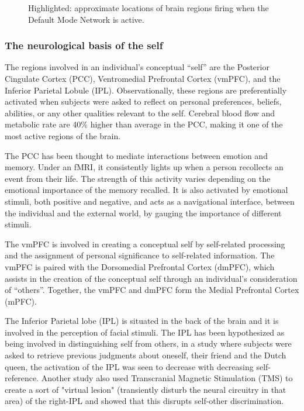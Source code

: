 \documentclass[a4paper, amsfonts, amssymb, amsmath, reprint, showkeys, nofootinbib, twoside]{revtex4-1}
\begin{document}
\begin{figure}[h!]
\begin{subfigure}[b]{0.48\linewidth}
  \end{subfigure}
  \caption{Highlighted: approximate locations of brain regions firing when the Default Mode Network is active.}
  \label{fig:dmn}
\end{figure}

\subsubsection{The neurological basis of the self}

The regions involved in an individual's conceptual ``self'' are the Posterior
Cingulate Cortex (PCC), Ventromedial Prefrontal Cortex (vmPFC), and the Inferior
Parietal Lobule (IPL). Observationally, these regions are preferentially activated when
subjects were asked to reflect on personal preferences, beliefs, abilities, or
any other qualities relevant to the self. \cite{defaultnetworkadaptive} Cerebral
blood flow and metabolic rate are 40\% higher than average in the PCC,
making it one of the most active regions of the brain. \cite{pccrole}

The PCC has been thought to mediate interactions between emotion and memory.
Under an fMRI, it consistently lights up when a person recollects an event from their
life. The strength of this activity varies depending on the emotional importance of
the memory recalled. It is also activated by emotional stimuli,
both positive and negative, and acts as a navigational interface, between the individual
and the external world, by gauging the importance of different stimuli. \cite{pccemotion}

The vmPFC is involved in creating a conceptual self by self-related processing
and the assignment of personal significance to self-related
information. \cite{dmnself} The vmPFC is paired with the Dorsomedial Prefrontal
Cortex (dmPFC), which assists in the creation of the conceptual self through an
individual's consideration of ``others''. Together, the vmPFC and dmPFC form the
Medial Prefrontal Cortex (mPFC).

The Inferior Parietal lobe (IPL) is situated in the back of the brain and it is
involved in the perception of facial stimuli. \cite{ipl}
The IPL has been hypothesized as being involved in distinguishing self from others, 
in a study where subjects were asked to retrieve 
previous judgments about oneself, their friend and the Dutch queen, 
the activation of the IPL was seen to decrease with decreasing self-reference. \cite{iplself} 
Another study also used Transcranial Magnetic Stimulation (TMS) to create a sort of "virtual lesion" 
(transiently disturb the neural circuitry in that area) of
the right-IPL and showed that this disrupts self-other discrimination. \cite{ipltms}
\end{document}

